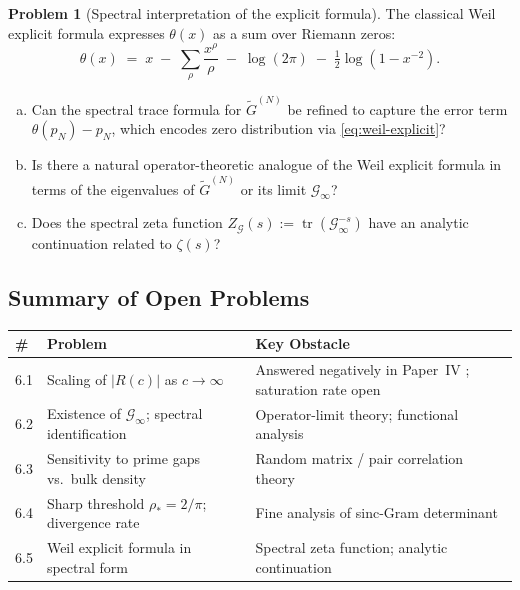 \documentclass[12pt,a4paper]{amsart}
\theoremstyle{definition}
\newtheorem{problem}{Problem}[section]
\newcommand{\Gcinf}{\mathcal{G}_\infty}
\newcommand{\tr}{\operatorname{tr}}
\begin{document}
\begin{problem}[Spectral interpretation of the explicit formula]
\label{prob:explicit-formula}
The classical Weil explicit formula \cite{Weil1952} expresses
$\theta(x)$ as a sum over Riemann zeros:
\begin{equation}
\label{eq:weil-explicit}
\theta(x)
\;=\; x
\;-\; \sum_\rho \frac{x^\rho}{\rho}
\;-\; \log(2\pi)
\;-\; \tfrac{1}{2}\log(1 - x^{-2}).
\end{equation}
\begin{enumerate}[(a)]
\item Can the spectral trace formula for $\widetilde{G}^{(N)}$
be refined to capture the error term $\theta(p_N) - p_N$,
which encodes zero distribution via \eqref{eq:weil-explicit}?
\item Is there a natural operator-theoretic analogue of the
Weil explicit formula in terms of the eigenvalues of
$\widetilde{G}^{(N)}$ or its limit $\Gcinf$?
\item Does the spectral zeta function
$Z_{\mathcal{G}}(s) := \tr(\Gcinf^{-s})$ have an analytic
continuation related to $\zeta(s)$?
\end{enumerate}
\end{problem}

\subsection{Summary of Open Problems}
\label{ssec:open-summary}

\begin{center}
\renewcommand{\arraystretch}{1.4}
\begin{tabular}{p{0.5cm} p{5.5cm} p{5.5cm}}
\hline
\textbf{\#} & \textbf{Problem} & \textbf{Key Obstacle} \\
\hline
6.1 & Scaling of $|R(c)|$ as $c \to \infty$
& Answered negatively in Paper~IV \cite{PaperIV}; saturation rate open \\[2pt]
6.2 & Existence of $\Gcinf$; spectral identification
& Operator-limit theory; functional analysis \\[2pt]
6.3 & Sensitivity to prime gaps vs.\ bulk density
& Random matrix / pair correlation theory \\[2pt]
6.4 & Sharp threshold $\rho_* = 2/\pi$; divergence rate
& Fine analysis of sinc-Gram determinant \\[2pt]
6.5 & Weil explicit formula in spectral form
& Spectral zeta function; analytic continuation \\[2pt]
\hline
\end{tabular}
\end{center}
\end{document}
